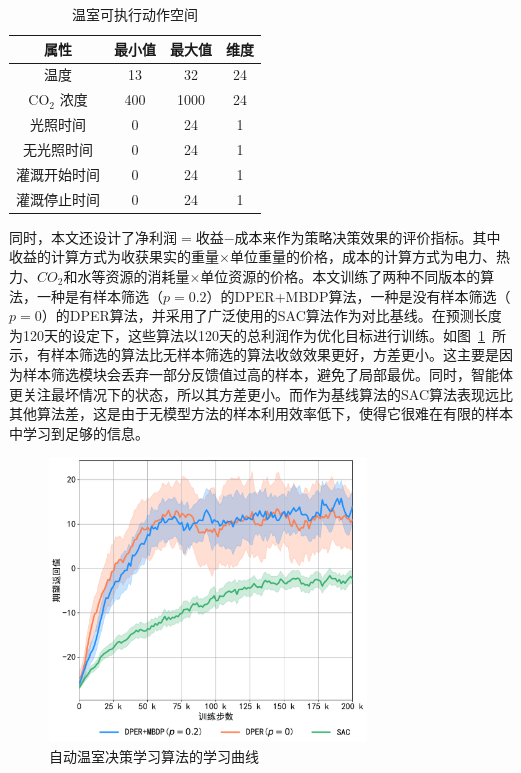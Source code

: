 \begin{table}[htbp]
\centering
\caption{温室可执行动作空间}
\begin{tabular}{cccc}
\toprule
\textbf{属性}                                     & \textbf{最小值} & \textbf{最大值} & \textbf{维度} \\
\midrule
温度          & 13           & 32           & 24           \\
CO$_2$ 浓度               & 400          & 1000         & 24           \\
光照时间                 & 0            & 24           & 1            \\
无光照时间                & 0            & 24           & 1            \\
灌溉开始时间         & 0            & 24           & 1            \\
灌溉停止时间          & 0            & 24           & 1            \\
\bottomrule
\end{tabular}
\label{tab:act-space}
\end{table}

同时，本文还设计了净利润$=$收益$-$成本来作为策略决策效果的评价指标。其中收益的计算方式为收获果实的重量$\times$单位重量的价格，成本的计算方式为电力、热力、$CO_2$和水等资源的消耗量$\times$单位资源的价格。本文训练了两种不同版本的算法，一种是有样本筛选（$p=0.2$）的DPER+MBDP算法，一种是没有样本筛选（$p=0$）的DPER算法，并采用了广泛使用的SAC算法作为对比基线。在预测长度为120天的设定下，这些算法以120天的总利润作为优化目标进行训练。如图~\ref{fig:acml-train}~所示，有样本筛选的算法比无样本筛选的算法收敛效果更好，方差更小。这主要是因为样本筛选模块会丢弃一部分反馈值过高的样本，避免了局部最优。同时，智能体更关注最坏情况下的状态，所以其方差更小。而作为基线算法的SAC算法表现远比其他算法差，这是由于无模型方法的样本利用效率低下，使得它很难在有限的样本中学习到足够的信息。

\begin{figure}[h]
\centering
\includegraphics[width=0.75\textwidth]{figures/acml-train.pdf}
\caption{自动温室决策学习算法的学习曲线}
\label{fig:acml-train}
\end{figure}

